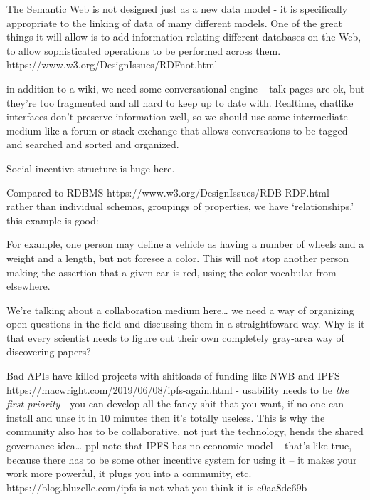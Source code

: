 \documentclass[10pt]{article}
\begin{document}
\begin{multicols}{2}
\begin{leftbar}
The Semantic Web is not designed just as a new data model - it is
specifically appropriate to the linking of data of many different
models. One of the great things it will allow is to add information
relating different databases on the Web, to allow sophisticated
operations to be performed across them.
https://www.w3.org/DesignIssues/RDFnot.html
\end{leftbar}

in addition to a wiki, we need some conversational engine -- talk pages
are ok, but they're too fragmented and all hard to keep up to date with.
Realtime, chatlike interfaces don't preserve information well, so we
should use some intermediate medium like a forum or stack exchange that
allows conversations to be tagged and searched and sorted and organized.

Social incentive structure is huge here.

Compared to RDBMS https://www.w3.org/DesignIssues/RDB-RDF.html -- rather
than individual schemas, groupings of properties, we have
`relationships.' this example is good:

\begin{leftbar}
For example, one person may define a vehicle as having a number of
wheels and a weight and a length, but not foresee a color. This will not
stop another person making the assertion that a given car is red, using
the color vocabular from elsewhere.
\end{leftbar}

We're talking about a collaboration medium here\ldots{} we need a way of
organizing open questions in the field and discussing them in a
straightfoward way. Why is it that every scientist needs to figure out
their own completely gray-area way of discovering papers?

Bad APIs have killed projects with shitloads of funding like NWB and
IPFS https://macwright.com/2019/06/08/ipfs-again.html - usability needs
to be \emph{the first priority} - you can develop all the fancy shit
that you want, if no one can install and unse it in 10 minutes then it's
totally useless. This is why the community also has to be collaborative,
not just the technology, hends the shared governance idea\ldots{} ppl
note that IPFS has no economic model -- that's like true, because there
has to be some other incentive system for using it -- it makes your work
more powerful, it plugs you into a community, etc.
https://blog.bluzelle.com/ipfs-is-not-what-you-think-it-is-e0aa8dc69b

\hypertarget{credit-assignment}{%
}
\end{multicols}
\end{document}
